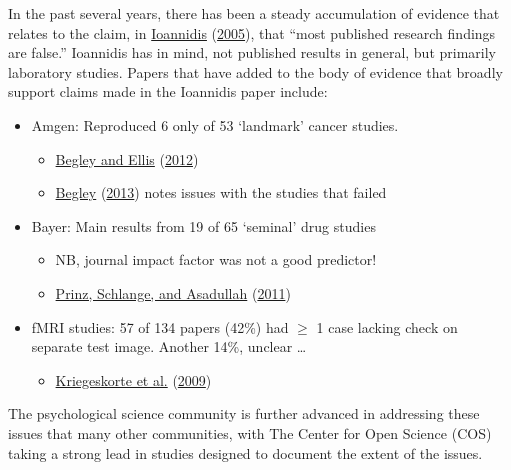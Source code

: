 \documentclass[
  10pt,
  b5paper]{book}
\providecommand{\tightlist}{%
  \setlength{\itemsep}{0pt}\setlength{\parskip}{0pt}}
\begin{document}
In the past several years, there has been a steady accumulation
of evidence that relates to the claim, in \protect\hyperlink{ref-r19_ioannidis_2005}{Ioannidis} (\protect\hyperlink{ref-r19_ioannidis_2005}{2005}),
that ``most published research findings are false.'' Ioannidis
has in mind, not published results in general, but primarily
laboratory studies. Papers that have added to the
body of evidence that broadly support claims made in the
Ioannidis paper include:

\begin{itemize}
\tightlist
\item
  Amgen: Reproduced 6 only of 53 `landmark' cancer studies.

  \begin{itemize}
  \tightlist
  \item
    \protect\hyperlink{ref-r23_begley_ellis_2012}{Begley and Ellis} (\protect\hyperlink{ref-r23_begley_ellis_2012}{2012})
  \item
    \protect\hyperlink{ref-r2_begley_2013}{Begley} (\protect\hyperlink{ref-r2_begley_2013}{2013}) notes issues with the studies that failed
  \end{itemize}
\item
  Bayer: Main results from 19 of 65 `seminal' drug studies

  \begin{itemize}
  \tightlist
  \item
    NB, journal impact factor was not a good predictor!
  \item
    \protect\hyperlink{ref-r9_prinz_schlange_asadullah_2011}{Prinz, Schlange, and Asadullah} (\protect\hyperlink{ref-r9_prinz_schlange_asadullah_2011}{2011})
  \end{itemize}
\item
  fMRI studies: 57 of 134 papers (42\%) had \(\geq\) 1 case lacking
  check on separate test image.
  Another 14\%, unclear \ldots{}

  \begin{itemize}
  \tightlist
  \item
    \protect\hyperlink{ref-r8_kriegeskorte_simmons_bellgowan_baker_2009}{Kriegeskorte et al.} (\protect\hyperlink{ref-r8_kriegeskorte_simmons_bellgowan_baker_2009}{2009})
  \end{itemize}
\end{itemize}

The psychological science community is further advanced in
addressing these issues that many other communities, with
The Center for Open Science (COS) taking a strong lead in
studies designed to document the extent of the issues.
\end{document}
